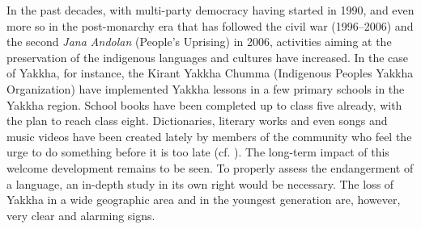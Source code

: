 In the past decades, with multi-party democracy having started in 1990, and even more so in the post-monarchy era that has followed the civil war (1996–2006) and the second \emph{Jana Andolan} (People's Uprising) in 2006, activities aiming at the preservation of the indigenous languages and cultures have increased. In the case of Yakkha, for instance, the Kirant Yakkha Chumma (Indigenous Peoples Yakkha Organization) have implemented Yakkha lessons in a few primary schools in the Yakkha region.  School books have been completed up to class five already, with the plan to reach class eight. Dictionaries, literary works and even songs and music videos have been created lately by members of the community who feel the urge to do something before it is too late (cf. ). The long-term impact of this welcome development remains to be seen. To properly assess the endangerment of a language, an in-depth study in its own right would be necessary. The loss of Yakkha in a wide geographic area and in the youngest generation are, however, very clear and alarming signs.





